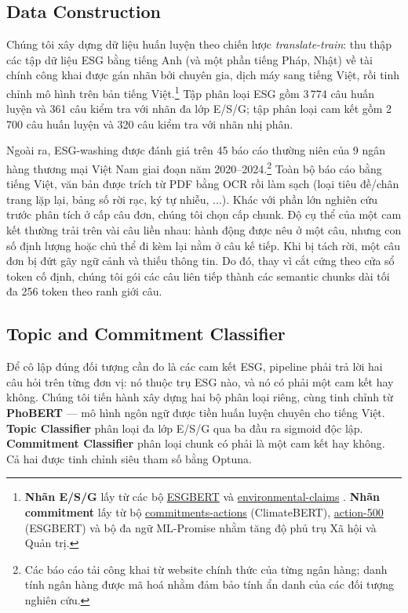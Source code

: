 \documentclass[runningheads]{llncs}
\begin{document}
\subsection{Data Construction}
Chúng tôi xây dựng dữ liệu huấn luyện theo chiến lược \emph{translate-train}: thu thập các tập dữ liệu ESG bằng tiếng Anh (và một phần tiếng Pháp, Nhật) về tài chính công khai được gán nhãn bởi chuyên gia, dịch máy sang tiếng Việt, rồi tinh chỉnh mô hình trên bản tiếng Việt.\footnote{\textbf{Nhãn E/S/G} lấy từ các bộ \href{https://huggingface.co/ESGBERT}{ESGBERT} \cite{esgbert} và \href{https://huggingface.co/datasets/climatebert/environmental_claims}{environmental-claims} \cite{webersinke2021climatebert}. \textbf{Nhãn commitment} lấy từ bộ \href{https://huggingface.co/datasets/climatebert/climate_commitments_actions}{commitments-actions} (ClimateBERT), \href{https://huggingface.co/ESGBERT}{action-500} (ESGBERT) và bộ đa ngữ ML-Promise \cite{seki-etal-2025-ml} nhằm tăng độ phủ trụ Xã hội và Quản trị.} Tập phân loại ESG gồm 3\,774 câu huấn luyện và 361 câu kiểm tra với nhãn đa lớp E/S/G; tập phân loại cam kết gồm 2\,700 câu huấn luyện và 320 câu kiểm tra với nhãn nhị phân.

Ngoài ra, ESG-washing được đánh giá trên 45 báo cáo thường niên của 9 ngân hàng thương mại Việt Nam giai đoạn năm 2020--2024.\footnote{Các báo cáo tải công khai từ website chính thức của từng ngân hàng; danh tính ngân hàng được mã hoá nhằm đảm bảo tính ẩn danh của các đối tượng nghiên cứu.} Toàn bộ báo cáo bằng tiếng Việt, văn bản được trích từ PDF bằng OCR rồi làm sạch (loại tiêu đề/chân trang lặp lại, bảng số rời rạc, ký tự nhiễu, ...). Khác với phần lớn nghiên cứu trước phân tích ở cấp câu đơn, chúng tôi chọn cấp chunk. Độ cụ thể của một cam kết thường trải trên vài câu liền nhau: hành động được nêu ở một câu, nhưng con số định lượng hoặc chủ thể đi kèm lại nằm ở câu kế tiếp. Khi bị tách rời, một câu đơn bị đứt gãy ngữ cảnh và thiếu thông tin. Do đó, thay vì cắt cứng theo cửa sổ token cố định, chúng tôi gói các câu liên tiếp thành các semantic chunks dài tối đa 256 token theo ranh giới câu.


\subsection{Topic and Commitment Classifier}
Để cô lập đúng đối tượng cần đo là các cam kết ESG, pipeline phải trả lời hai câu hỏi trên từng đơn vị: nó thuộc trụ ESG nào, và nó có phải một cam kết hay không. Chúng tôi tiến hành xây dựng hai bộ phân loại riêng, cùng tinh chỉnh từ \textbf{PhoBERT} \cite{nguyen2020phobert} --- mô hình ngôn ngữ được tiền huấn luyện chuyên cho tiếng Việt. \textbf{Topic Classifier} phân loại đa lớp E/S/G qua ba đầu ra sigmoid độc lập. \textbf{Commitment Classifier} phân loại chunk có phải là một cam kết hay không. Cả hai được tinh chỉnh siêu tham số bằng Optuna.
\end{document}
